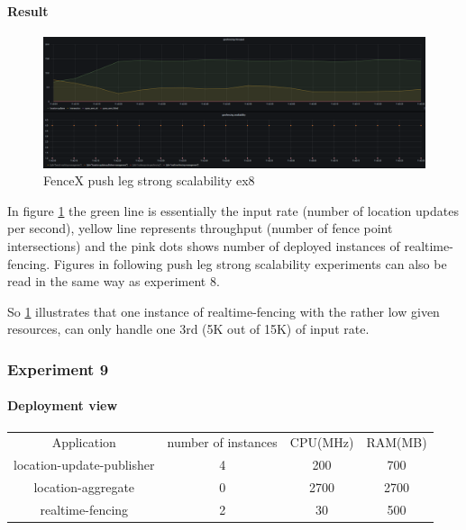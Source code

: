 \documentclass[a4]{report}
\begin{document}
    \paragraph{Result}
    \begin{figure}[ht]
        \caption{FenceX push leg strong scalability ex8}
        \label{fig:ex8}
        \includegraphics[scale=0.4]{images/evaluation/ex8-benchmarking-ongoing-2per4sec.png}
    \end{figure}

    In figure \ref{fig:ex8} the green line is essentially the input rate (number of location updates per second),
    yellow line represents throughput (number of fence point intersections) and the pink dots shows number of
    deployed instances of realtime-fencing.
    Figures in following push leg strong scalability experiments can also be read in the same way as experiment 8.

    So \ref{fig:ex8} illustrates that one instance of realtime-fencing with the rather low given resources, can only
    handle one 3rd (5K out of 15K) of input rate.

    \subsubsection{Experiment 9}

    \paragraph{Deployment view}
    \begin{center}
        \begin{tabular}{ c c c c }
            Application               & number of instances & CPU(MHz) & RAM(MB) \\
            location-update-publisher & 4                   & 200      & 700     \\
            location-aggregate        & 0                   & 2700     & 2700    \\
            realtime-fencing          & 2                   & 30       & 500     \\
        \end{tabular}
    \end{center}
\end{document}
